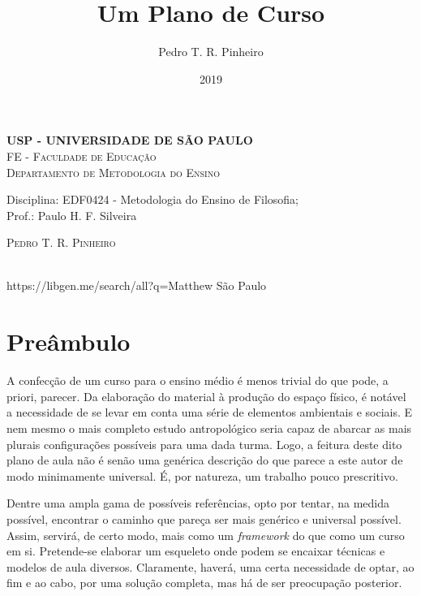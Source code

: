 \documentclass[12pt,a4paper]{article}
\author{Pedro T. R. Pinheiro}
\date{2019}
\title{Um Plano de Curso}
\newcommand{\subtitulo}{}
\newcommand{\disciplina}{EDF0424 - Metodologia do Ensino de Filosofia}
\newcommand{\departamento}{Departamento de Metodologia do Ensino}
\newcommand{\unidade}{FE - Faculdade de Educação}
\newcommand{\prof}{Paulo H. F. Silveira}
\begin{document}
	\begin{center}
				\textbf{
				\LARGE USP - UNIVERSIDADE DE SÃO PAULO \\
			}
			\Large \textsc{\unidade} \\
			\large \textsc{\departamento}\\
			\vspace*{1cm}
				
			Disciplina: \disciplina; \\Prof.: \prof
			\vfill
			\begin{center}
				{\Large \textsc{Pedro T. R. Pinheiro}} \\ 
				\vspace{1cm}
				\LARGE\textbf{\thetitle} \\
				\Large\emph{\subtitulo}
			\end{center}https://libgen.me/search/all?q=Matthew%
			\vfill
			\large São Paulo \\
			\large\thedate
			\vspace*{1cm}
			\thispagestyle{empty}
	\end{center}

	\newpage
	
	\setlength{\parskip}{0.5cm}
	\setlength{\parindent}{1.1cm}
	\onehalfspacing
	
	\section{Preâmbulo}
	
	
	A confecção de um curso para o ensino médio é menos trivial do que 
	pode, a priori, parecer. Da elaboração do material à produção do 
	espaço físico, é notável a necessidade de se levar em conta uma 
	série de elementos ambientais e sociais. E nem mesmo o mais completo
	estudo antropológico seria capaz de abarcar as mais plurais 
	configurações possíveis para uma dada turma. Logo, a feitura deste 
	dito plano de aula não é senão uma genérica descrição do que 
	parece a este autor de modo minimamente universal. É, por natureza, 
	um trabalho pouco prescritivo. 
	
	Dentre uma ampla gama de possíveis referências, opto por tentar, 
	na medida possível, encontrar o caminho que pareça ser mais 
	genérico e universal possível. Assim, servirá, de certo modo, mais como 
	um \textit{framework} do que como um curso em si. Pretende-se 
	elaborar um esqueleto onde podem se encaixar técnicas e modelos de 
	aula diversos. Claramente, haverá, uma certa necessidade de optar, 
	ao fim e ao cabo, por uma solução completa, mas há de ser preocupação 
	posterior. 
	
\end{document}
